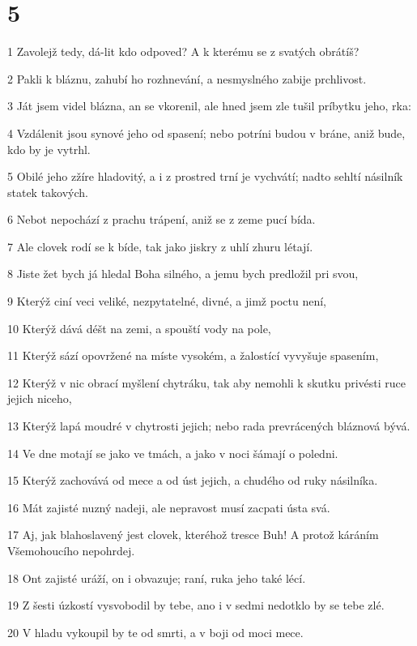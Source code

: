\chapter{5}

\par 1 Zavolejž tedy, dá-lit kdo odpoved? A k kterému se z svatých obrátíš?
\par 2 Pakli k bláznu, zahubí ho rozhnevání, a nesmyslného zabije prchlivost.
\par 3 Ját jsem videl blázna, an se vkorenil, ale hned jsem zle tušil príbytku jeho, rka:
\par 4 Vzdálenit jsou synové jeho od spasení; nebo potríni budou v bráne, aniž bude, kdo by je vytrhl.
\par 5 Obilé jeho zžíre hladovitý, a i z prostred trní je vychvátí; nadto sehltí násilník statek takových.
\par 6 Nebot nepochází z prachu trápení, aniž se z zeme pucí bída.
\par 7 Ale clovek rodí se k bíde, tak jako jiskry z uhlí zhuru létají.
\par 8 Jiste žet bych já hledal Boha silného, a jemu bych predložil pri svou,
\par 9 Kterýž ciní veci veliké, nezpytatelné, divné, a jimž poctu není,
\par 10 Kterýž dává déšt na zemi, a spouští vody na pole,
\par 11 Kterýž sází opovržené na míste vysokém, a žalostící vyvyšuje spasením,
\par 12 Kterýž v nic obrací myšlení chytráku, tak aby nemohli k skutku privésti ruce jejich niceho,
\par 13 Kterýž lapá moudré v chytrosti jejich; nebo rada prevrácených bláznová bývá.
\par 14 Ve dne motají se jako ve tmách, a jako v noci šámají o poledni.
\par 15 Kterýž zachovává od mece a od úst jejich, a chudého od ruky násilníka.
\par 16 Mát zajisté nuzný nadeji, ale nepravost musí zacpati ústa svá.
\par 17 Aj, jak blahoslavený jest clovek, kteréhož tresce Buh! A protož káráním Všemohoucího nepohrdej.
\par 18 Ont zajisté uráží, on i obvazuje; raní, ruka jeho také lécí.
\par 19 Z šesti úzkostí vysvobodil by tebe, ano i v sedmi nedotklo by se tebe zlé.
\par 20 V hladu vykoupil by te od smrti, a v boji od moci mece.

